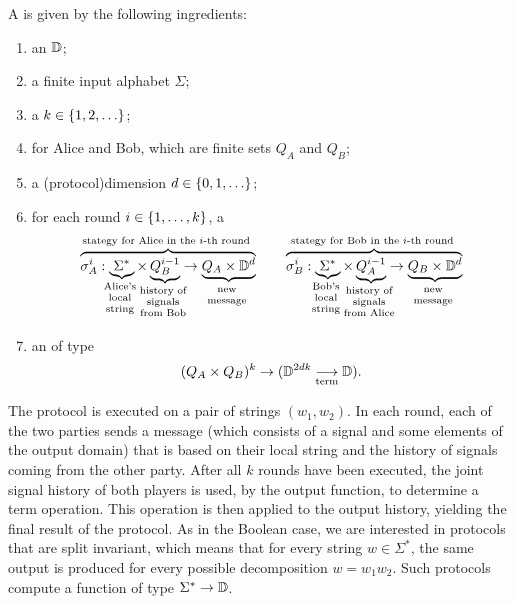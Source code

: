 \begin{definition}\label{def:two-party-protocol-general} A 
   is given by the following ingredients: 
  \begin{enumerate}
    \item an  $\mathbb D$;
    \item a finite input alphabet $\Sigma$;
    \item a  $k \in \{1,2,\ldots\}$;
    \item {} for Alice and Bob, which are finite sets $Q_A$ and $Q_B$;
    \item a \intro(protocol){dimension} $d \in \{0,1,\ldots\}$;
    \item for each round $i \in \{1,\ldots,k\}$, a 
    \begin{align*}
    \myoverbrace{\sigma_A^i : \myunderbrace{\Sigma^*}{Alice's \\ local\\ string} \times \myunderbrace{Q_B^{i-1}}{history of \\ signals \\ from Bob}  \to \myunderbrace{Q_A \times \domain^d}{new\\ message}}{stategy for Alice in the $i$-th round}
    \qquad 
        \myoverbrace{\sigma_B^i : \myunderbrace{\Sigma^*}{Bob's \\ local\\ string} \times \myunderbrace{Q_A^{i-1}}{history of \\ signals \\ from Alice}  \to \myunderbrace{Q_B \times \domain^d}{new\\ message}}{stategy for Bob in the $i$-th round}
    \end{align*}
    \item an  of type \begin{align*}
    (Q_A \times Q_B)^{k} \to (\mathbb D^{2dk} \underset{\text{term}}{\longrightarrow} \mathbb D).
    \end{align*}
  \end{enumerate}
\end{definition}




The protocol is executed on a pair of strings $(w_1,w_2)$. In each round, each of the two parties  sends a message (which consists of a signal and some elements of the output domain) that is based on their local string and the history of signals coming from the other party. After all $k$ rounds have been executed, the joint signal history of both players is used, by the output function, to determine a term operation. This operation is then applied to the output history, yielding the final result of the protocol. As in the Boolean case, we are interested in protocols that are split invariant, which means that for every string $w \in \Sigma^*$, the same output is produced for every possible decomposition $w = w_1 w_2$. Such protocols compute a function of type $\Sigma^* \to \mathbb D$. 


